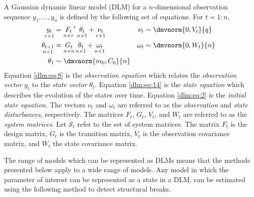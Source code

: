 A Gaussian dynamic linear model (DLM) for a $n$-dimensional observation sequence $y_{1}, \dots, y_{n}$ is defined by the following set of equations.%
For $t = 1:n$,
\begin{align}
  \label{dlm:eq:8}
  \underset{r \times 1}{y_t} &= \underset{n \times r}{F_{t}}' \, \underset{n \times 1}{\theta_t} + \underset{r \times 1}{\nu_t} & \nu_{t} &\sim \dmvnorm{0, V_{t}}{q} \\
  \label{dlm:eq:14}
  \underset{n \times 1}{\theta_{t+1}} &= \underset{n \times n}{G_{t}} \, \underset{n \times 1}{\theta_{t}} + \underset{n \times 1}{\omega_{t}} & \omega_{t} &\sim \dmvnorm{0, W_{t}}{n} \\
  \label{dlm:eq:2}
  \theta_{1} & \sim \dmvnorm{m_{0}, C_{0}}{n}
\end{align}
Equation \eqref{dlm:eq:8} is the \textit{observation equation} which relates the \textit{observation vector} $y_{t}$ to the \textit{state vector} $\theta_{t}$.
Equation \eqref{dlm:eq:14} is the \textit{state equation} which describes the evolution of the states over time.
Equation \eqref{dlm:eq:2} is the \textit{initial state equation}.
The vectors $\nu_{t}$ and $\omega_{t}$ are referred to as the \textit{observation} and \textit{state disturbances}, respectively.
The matrices $F_{t}$, $G_{t}$, $V_{t}$, and $W_{t}$ are referred to as the \textit{system matrices}.
Let $\mathcal{S}_{t}$ refer to the set of system matrices.
The matrix $F_{t}$ is the design matrix, $G_{t}$ is the transition matrix, $V_{t}$ is the observation covariance matrix, and $W_{t}$ the state covariance matrix.

The range of models which can be represented as DLMs means that the methods presented below apply to a wide range of models.
Any model in which the parameter of interest can be represented as a state in a DLM, can be estimated using the following method to detect structural breaks.

